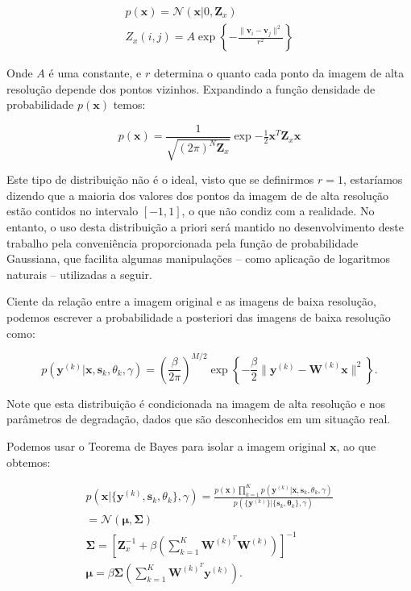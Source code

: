 \documentclass[12pt,openright,oneside,a4paper,english,brazil]{abntex2}
\begin{document}
\begin{gather}
	p(\mathbf{x}) = \mathcal{N}(\mathbf{x} | 0, \mathbf{Z}_x) \\ 
	Z_x(i,j) = A \exp \left\{ - \frac{\|\mathbf{v}_i - \mathbf{v}_j \|^2}{r^2} \right\}
\end{gather}

Onde $A$ é uma constante, e $r$ determina o quanto cada ponto da imagem de alta resolução depende dos pontos vizinhos.
Expandindo a função densidade de probabilidade $p(\mathbf{x})$ temos:

\begin{equation}
	p(\mathbf{x}) = \frac{1}{\sqrt{(2\pi)^N \mathbf{Z}_x}}\exp{-\tfrac{1}{2} \mathbf{x}^T \mathbf{Z}_x \mathbf{x}}
\end{equation}

Este tipo de distribuição não é o ideal, visto que se definirmos $r=1$, estaríamos dizendo que a maioria dos valores dos pontos da imagem de de alta resolução estão contidos no intervalo $[-1,1]$, o que não condiz com a realidade.
No entanto, o uso desta distribuição a priori será mantido no desenvolvimento deste trabalho pela conveniência proporcionada pela função de probabilidade Gaussiana, que facilita algumas manipulações -- como aplicação de logaritmos naturais --  utilizadas a seguir.

Ciente da relação entre a imagem original e as imagens de baixa resolução, podemos escrever a probabilidade a posteriori das imagens de baixa resolução como:

\begin{equation}
	\label{eq:posterior0}
	p(\mathbf{y}^{(k)} | \mathbf{x}, \mathbf{s}_k, \theta_k, \gamma) = 
	\left(\frac{\beta}{2\pi}\right)^{M/2}
	\exp \left\{ -\frac{\beta}{2} \| \mathbf{y}^{(k)} - \mathbf{W}^{(k)} \mathbf{x} \|^2 \right\}.
\end{equation}

Note que esta distribuição é condicionada na imagem de alta resolução e nos parâmetros de degradação, dados que são desconhecidos em um situação real.

Podemos usar o Teorema de Bayes para isolar a imagem original $\mathbf{x}$, ao que obtemos:

\begin{gather}
	\label{eq:posteriordist}
	p(\mathbf{x}|\{\mathbf{y}^{(k)},\mathbf{s}_k,\theta_k\}, \gamma) = 
	\frac{p(\mathbf{x})\prod^K_{k=1} p(\mathbf{y}^{(k)}|\mathbf{x},\mathbf{s}_k,\theta_k, \gamma)}
	{p(\{\mathbf{y}^{(k)}\}|\{\mathbf{s}_k,\mathbf{\theta}_k\},\gamma)} \\
	= \mathcal{N}(\boldsymbol{\mu},\mathbf{\Sigma}) \\
	\mathbf{ \Sigma }= \left[\mathbf{Z}^{-1}_x + \beta \left( \sum^K_{k = 1} \mathbf{W}^{(k)^T} \mathbf{W}^{(k)} \right) \right]^{-1} \\
	\boldsymbol{\mu} = \beta \mathbf{ \Sigma } \left( \sum^K_{k=1} \mathbf{W}^{(k)^T}\mathbf{y}^{(k)} \right).
\end{gather}
\end{document}

